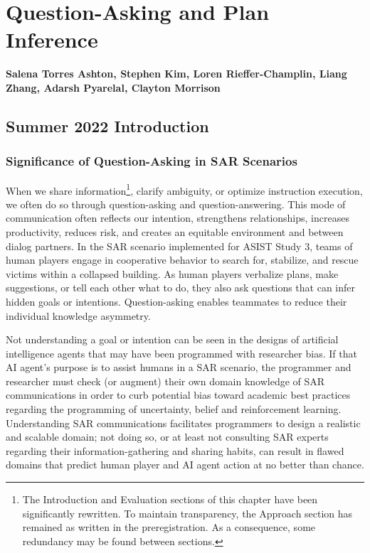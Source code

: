 \chapter{Question-Asking and Plan Inference}
\label{ch:question_plan}
\textbf{Salena Torres Ashton, Stephen Kim, Loren Rieffer-Champlin, Liang Zhang,
Adarsh Pyarelal, Clayton Morrison}

\section{Summer 2022 Introduction}
\subsection{Significance of Question-Asking in SAR Scenarios}
When we share information\footnote{The Introduction and Evaluation sections of this chapter have been significantly rewritten. To maintain transparency, the Approach section has remained as written in the preregistration. As a consequence, some redundancy may be found between sections.}, clarify ambiguity, or optimize instruction execution, we often do so through question-asking and question-answering. This mode of communication often reflects our intention, strengthens relationships, increases productivity, reduces risk, and creates an equitable environment \citet{rothe_lake_gureckis_2018} and \citet{alaimi_2020} between dialog partners. In the SAR scenario implemented for ASIST Study 3, teams of human players engage in cooperative behavior to search for, stabilize, and rescue victims within a collapsed building. As human players verbalize plans, make suggestions, or tell each other what to do, they also ask questions that can infer hidden goals or intentions. Question-asking enables teammates to reduce their individual knowledge asymmetry.  

Not understanding a goal or intention can be seen in the designs of artificial intelligence agents that may have been programmed with researcher bias. If that AI agent's purpose is to assist humans in a SAR scenario, the programmer and researcher must check (or augment) their own domain knowledge of SAR communications in order to curb potential bias toward academic best practices regarding the programming of uncertainty, belief and reinforcement learning. Understanding SAR communications facilitates programmers to design a realistic and scalable domain; not doing so, or at least not consulting SAR experts regarding their information-gathering and sharing habits, can result in flawed domains that predict human player and AI agent action at no better than chance. 

